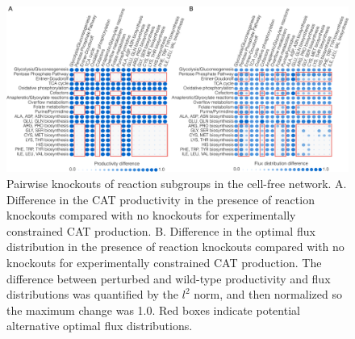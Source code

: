 \documentclass[journal=asbcd6,manuscript=article]{achemso}
\begin{document}
\clearpage

\begin{figure}[t!]
\includegraphics[width=1.0\textwidth]{./figs/Fig-7-FluxDistribution-Analysis.pdf}
\caption{Pairwise knockouts of reaction subgroups in the cell-free network.
A. Difference in the CAT productivity in the presence of reaction knockouts compared with no knockouts for experimentally constrained CAT production.
B. Difference in the optimal flux distribution in the presence of reaction knockouts compared with no knockouts for experimentally constrained CAT production.
The difference between perturbed and wild-type productivity and flux distributions was quantified by the $l^{2}$ norm, and then normalized so the maximum change was 1.0.
Red boxes indicate potential alternative optimal flux distributions.}
\label{fig:norm}
\end{figure}

\clearpage


\end{document}
